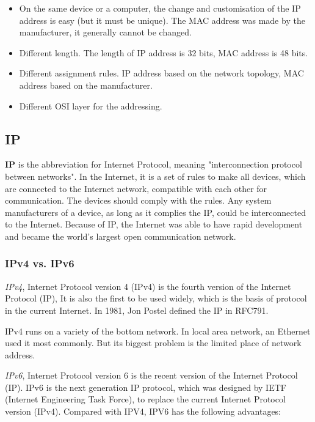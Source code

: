 \begin{itemize}
	\item On the same device or a computer, the change and customisation of the IP address is easy (but it must be unique). The MAC address was made by the manufacturer, it generally cannot be changed.
	\item Different length. The length of IP address is 32 bits, MAC address is 48 bits.
	\item Different assignment rules. IP address based on the network topology, MAC address based on the manufacturer.
	\item Different OSI layer for the addressing.
\end{itemize}

\subsection{IP}

\textbf{IP} is the abbreviation for Internet Protocol, meaning "interconnection protocol between networks". In the Internet, it is a set of rules to make all devices, which are connected to the Internet network, compatible with each other for communication. The devices should comply with the rules. Any system manufacturers of a device, as long as it complies the IP, could be interconnected to the Internet. Because of IP, the Internet was able to have rapid development and became the world's largest open communication network.  

\subsubsection{IPv4 vs. IPv6}

\textit{IPv4}, Internet Protocol version 4 (IPv4) is the fourth version of the Internet Protocol (IP), It is also the first to be used widely, which is the basis of protocol in the current Internet. In 1981, Jon Postel defined the IP in RFC791.  

IPv4 runs on a variety of the bottom network. In local area network, an Ethernet used it most commonly. But its biggest problem is the limited place of network address.  

\textit{IPv6}, Internet Protocol version 6 is the recent version of the Internet Protocol (IP). IPv6 is the next generation IP protocol, which was designed by IETF (Internet Engineering Task Force), to replace the current Internet Protocol version (IPv4).  
Compared with IPV4, IPV6 has the following advantages:  

